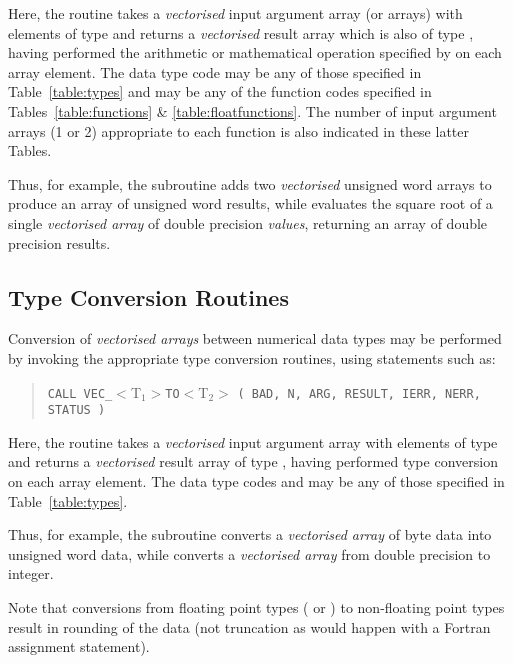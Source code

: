 Here, the  routine takes a {\em vectorised} input argument array
(or arrays) with  elements of type  and returns a {\em
vectorised} result array which is also of type , having performed
the arithmetic or mathematical operation specified by  on 
each array element. 
The data type code  may be any of those specified in
Table~\ref{table:types} and  may be any of the function
codes specified in Tables~\ref{table:functions} \& 
\ref{table:floatfunctions}.
The number of input argument arrays (1 or 2) appropriate to each function is
also indicated in these latter Tables.

Thus, for example, the subroutine  adds two {\em vectorised}
unsigned word arrays to produce an array of unsigned word results, while
 evaluates the square root of a single {\em vectorised 
array} of double precision {\em values}, returning an array of double
precision results. 

\subsection{ Type Conversion Routines}

Conversion of {\em vectorised arrays} between numerical data types may be
performed by invoking the appropriate  type conversion routines,
using statements such as: 

\begin{quote}
\verb#CALL VEC_#$<$T$_{1}>$\verb#TO#$<$T$_{2}>$
\verb#( BAD, N, ARG, RESULT, IERR, NERR, STATUS )#
\end{quote}

Here, the  routine takes a {\em vectorised} input argument array
with  elements of type  and returns a {\em
vectorised} result array of type , having performed type
conversion on each array element. 
The data type codes  and  may be any of
those specified in Table~\ref{table:types}. 

Thus, for example, the subroutine  converts a {\em
vectorised array} of byte data into unsigned word data, while
 converts a {\em vectorised array} from double precision to
integer. 

Note that conversions from floating point types ( or
) to non-floating point types result in rounding of the data
(not truncation as would happen with a Fortran assignment statement). 

